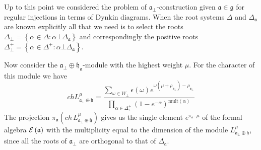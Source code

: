 \documentclass[a4paper,12pt]{article}
\theoremstyle{definition} \newtheorem{Def}{Definition}
\begin{document}
Up to this point we considered the problem of $\mathfrak{a}_{\bot}$-construction given $\mathfrak{a}\in\mathfrak{g}$ for regular injections in terms of Dynkin diagrams. When the root systems $ \Delta$ and $\Delta_{\mathfrak{a}}$ are known explicitly all that we need is to select the roots  
$\Delta_{\bot}=\left\{\alpha\in \Delta:\alpha\bot \Delta_{\mathfrak{a}}\right\}$ and correspondingly the positive roots
$\Delta^{+}_{\bot}=\left\{\alpha\in \Delta^{+}:\alpha\bot \Delta_{\mathfrak{a}}\right\}$. 

Now consider the $\mathfrak{a}_{\bot}\oplus\mathfrak{h}_{\mathfrak{a}}$-module 
with the highest weight $\mu$. For the character of this module we have
\begin{equation}
  \label{eq:41}
  ch L^{\mu}_{\mathfrak{a}_{\bot}\oplus \mathfrak{h}}= \frac{\sum_{\omega\in W_{\bot}} \epsilon(\omega) e^{\omega(\mu+\rho_{\mathfrak{a}_{\bot}})-\rho_{\mathfrak{a}_{\bot}}}}{\prod_{\alpha\in\Delta^{+}_{\bot}}(1-e^{-\alpha})^{\mathrm{mult}(\alpha)}}
\end{equation}
The projection $\pi_{\mathfrak{a}}(ch\, L^{\mu}_{\mathfrak{a}_{\bot}\oplus \mathfrak{h}})$ gives us the single element $e^{\pi_{\mathfrak{a}} \cdot\mu}$ of the formal algebra ${\cal E}\left( \mathfrak{a}\right)$ with the multiplicity equal to the dimension of the module $L^{\mu}_{\mathfrak{a}_{\bot}\oplus \mathfrak{h}}$, since all the roots of $\mathfrak{a}_{\bot}$ are orthogonal to  that of $\Delta_{\mathfrak{a}}$.
\end{document}
